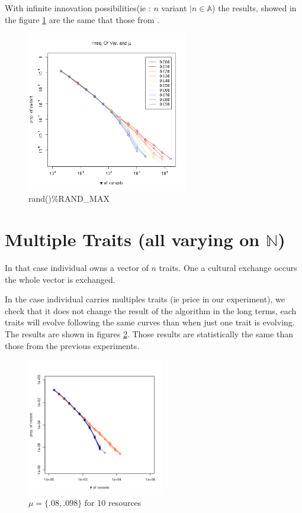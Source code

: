 \documentclass[a4paper]{article}
\begin{document}
With infinite innovation possibilities(ie : $n$ variant $| n\in\mathbb{A} $) the results, showed in the figure \ref{fig:allMutation} are the same that those from \cite{bentley2004randomdriftandculturechange}.
\begin{figure}[hbp]
	\begin{center}
		\includegraphics[width=7cm]{img/allmuRandMax.png}
	\end{center}
	\caption{rand()\%RAND\_MAX}
	\label{fig:allMutation}
\end{figure}


\section{Multiple Traits (all varying on $\mathbb{N}$)}
In that case individual owns a vector of $n$ traits. One a cultural exchange occurs the whole vector is exchanged.

In the case individual carries multiples traits (ie price in our experiment), we check that it does not change the result of the algorithm in the long terms, each traits will evolve following the same curves than when just one trait is evolving. The results are shown in figures \ref{fig:10resources}. Those results are statistically the same than those from the previous experiments.
\begin{figure}[h]
	\begin{center}
		\includegraphics[width=6cm]{img/10resources.png}
	\end{center}
	\caption{$\mu=\{.08,.098\}$ for 10 resources}
	\label{fig:10resources}
\end{figure}
\end{document}
